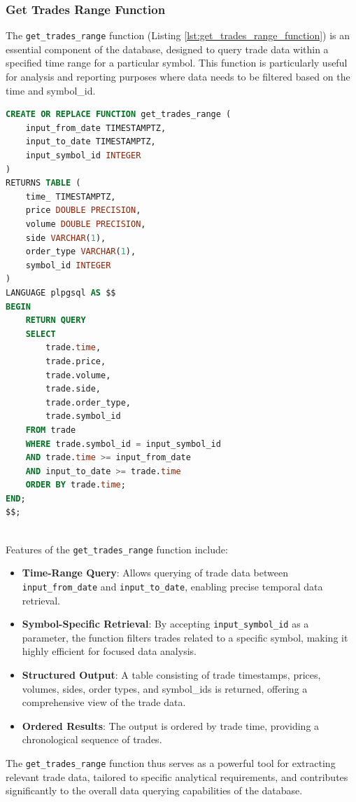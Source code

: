 \subsubsection{Get Trades Range Function}
The \texttt{get\_trades\_range} function (Listing \ref{lst:get_trades_range_function}) is an essential component of the database, designed to query trade data within a specified time range for a particular symbol. This function is particularly useful for analysis and reporting purposes where data needs to be filtered based on the time and symbol\_id. 
\begin{lstlisting}[language=SQL, caption={Function for Retrieving Trades Within a Specified Range}, label={lst:get_trades_range_function}]
CREATE OR REPLACE FUNCTION get_trades_range (
    input_from_date TIMESTAMPTZ,
    input_to_date TIMESTAMPTZ,
    input_symbol_id INTEGER 
)
RETURNS TABLE (
    time_ TIMESTAMPTZ,
    price DOUBLE PRECISION,
    volume DOUBLE PRECISION,
    side VARCHAR(1),
    order_type VARCHAR(1), 
    symbol_id INTEGER
)
LANGUAGE plpgsql AS $$
BEGIN
    RETURN QUERY
    SELECT
        trade.time,
        trade.price,
        trade.volume,
        trade.side,
        trade.order_type, 
        trade.symbol_id
    FROM trade 
    WHERE trade.symbol_id = input_symbol_id 
    AND trade.time >= input_from_date
    AND input_to_date >= trade.time
    ORDER BY trade.time; 
END;
$$;
\end{lstlisting}
\mbox{} \\
Features of the \texttt{get\_trades\_range} function include:
\begin{itemize}
    \item \textbf{Time-Range Query}: Allows querying of trade data between \texttt{input\_from\_date} and \texttt{input\_to\_date}, enabling precise temporal data retrieval.
    \item \textbf{Symbol-Specific Retrieval}: By accepting \texttt{input\_symbol\_id} as a parameter, the function filters trades related to a specific symbol, making it highly efficient for focused data analysis.
    \item \textbf{Structured Output}: A table consisting of trade timestamps, prices, volumes, sides, order types, and symbol\_ids is returned, offering a comprehensive view of the trade data.
    \item \textbf{Ordered Results}: The output is ordered by trade time, providing a chronological sequence of trades.
\end{itemize}

The \texttt{get\_trades\_range} function thus serves as a powerful tool for extracting relevant trade data, tailored to specific analytical requirements, and contributes significantly to the overall data querying capabilities of the database.

